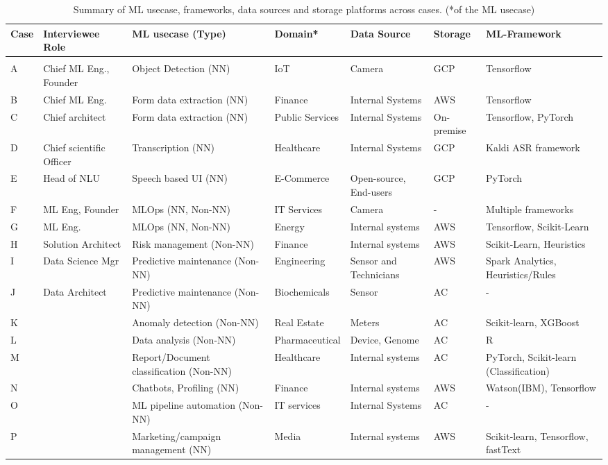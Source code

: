 

\begin{table*}[t]
 \centering
  \caption{Summary of ML usecase, frameworks, data sources and storage platforms across cases. (*of the ML usecase)}
  \begin{tabular}{p{}p{}p{}p{}p{2cm}p{1cm}p{}}
    \toprule
    \textbf{Case} & \textbf{Interviewee Role} & \textbf{ML usecase (Type)} & \textbf{Domain*} &\textbf{Data Source} & \textbf{Storage} & \textbf{ML-Framework} \\
    \toprule \\
    A & Chief ML Eng., Founder & Object Detection (NN) & IoT & Camera & GCP & Tensorflow \\
    B & Chief ML Eng. & Form data extraction  (NN) & Finance & Internal Systems & AWS & Tensorflow \\
    C & Chief architect & Form data extraction (NN) & Public Services & Internal Systems & On-premise & Tensorflow, PyTorch \\
    D & Chief scientific Officer & Transcription (NN) & Healthcare & Internal Systems & GCP & Kaldi ASR framework \\
    E & Head of NLU & Speech based UI (NN) & E-Commerce & Open-source, End-users & GCP & PyTorch \\
   F & ML Eng, Founder & MLOps (NN, Non-NN) & IT Services & Camera  & - & Multiple frameworks \\
    G & ML Eng. & MLOps (NN, Non-NN)  & Energy & Internal systems & AWS & Tensorflow, Scikit-Learn \\
    H & Solution Architect & Risk management (Non-NN) & Finance & Internal systems & AWS & Scikit-Learn, Heuristics \\
    I & Data Science Mgr & Predictive maintenance (Non-NN) & Engineering & Sensor and Technicians & AWS &  Spark Analytics, Heuristics/Rules \\
    J & Data Architect & Predictive maintenance (Non-NN) & Biochemicals & Sensor & AC & - \\
    K & & Anomaly detection (Non-NN) & Real Estate & Meters & AC & Scikit-learn, XGBoost \\
    L & & Data analysis (Non-NN) & Pharmaceutical & Device,  Genome & AC & R \\
    M & & Report/Document classification (Non-NN) & Healthcare & Internal systems & AC & PyTorch, Scikit-learn (Classification) \\
    N & & Chatbots, Profiling (NN) & Finance & Internal systems & AWS & Watson(IBM), Tensorflow \\
    O & & ML pipeline automation (Non-NN) & IT services & Internal Systems & AC & - \\
    P && Marketing/campaign management (NN) & Media & Internal systems & AWS & Scikit-learn, Tensorflow, fastText \\
    \hline
    

\end{tabular}
\end{table*}
